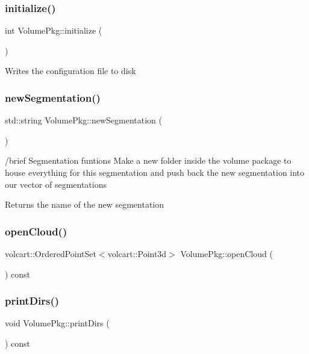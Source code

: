 \subsubsection{\texorpdfstring{initialize()}{initialize()}}
{\footnotesize\ttfamily int Volume\+Pkg\+::initialize (\begin{DoxyParamCaption}{ }\end{DoxyParamCaption})}

Writes the configuration file to disk \hypertarget{classVolumePkg_ae57e71436c7e3c4db73be88b49924637}{}\label{classVolumePkg_ae57e71436c7e3c4db73be88b49924637} 
\subsubsection{\texorpdfstring{new\+Segmentation()}{newSegmentation()}}
{\footnotesize\ttfamily std\+::string Volume\+Pkg\+::new\+Segmentation (\begin{DoxyParamCaption}{ }\end{DoxyParamCaption})}

/brief Segmentation funtions Make a new folder inside the volume package to house everything for this segmentation and push back the new segmentation into our vector of segmentations \begin{DoxyReturn}{Returns}
the name of the new segmentation 
\end{DoxyReturn}
\hypertarget{classVolumePkg_a6948e4fed7d29257efa5752b25c8f877}{}\label{classVolumePkg_a6948e4fed7d29257efa5752b25c8f877} 
\subsubsection{\texorpdfstring{open\+Cloud()}{openCloud()}}
{\footnotesize\ttfamily volcart\+::\+Ordered\+Point\+Set$<$volcart\+::\+Point3d$>$ Volume\+Pkg\+::open\+Cloud (\begin{DoxyParamCaption}{ }\end{DoxyParamCaption}) const}

\hypertarget{classVolumePkg_a3489e485f40be9bdcb4b993b6aaccc2d}{}\label{classVolumePkg_a3489e485f40be9bdcb4b993b6aaccc2d} 
\subsubsection{\texorpdfstring{print\+Dirs()}{printDirs()}}
{\footnotesize\ttfamily void Volume\+Pkg\+::print\+Dirs (\begin{DoxyParamCaption}{ }\end{DoxyParamCaption}) const\hspace{0.3cm}{\ttfamily [inline]}}

